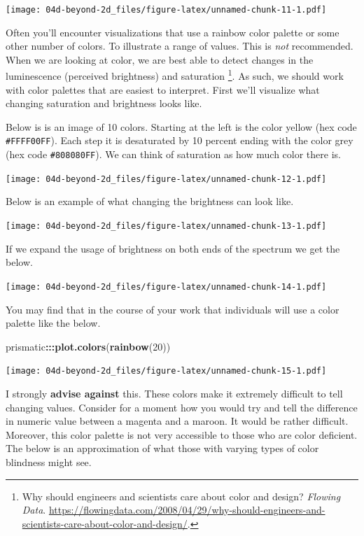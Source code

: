 \documentclass[
]{book}
\newenvironment{Shaded}{\begin{snugshade}}{\end{snugshade}}
\newcommand{\DecValTok}[1]{\textcolor[rgb]{0.00,0.00,0.81}{#1}}
\newcommand{\KeywordTok}[1]{\textcolor[rgb]{0.13,0.29,0.53}{\textbf{#1}}}
\newcommand{\NormalTok}[1]{#1}
\newcommand{\OperatorTok}[1]{\textcolor[rgb]{0.81,0.36,0.00}{\textbf{#1}}}
\begin{document}
\texttt{[image: 04d-beyond-2d\_files/figure-latex/unnamed-chunk-11-1.pdf]}

Often you'll encounter visualizations that use a rainbow color palette or some other number of colors. To illustrate a range of values. This is \emph{not} recommended. When we are looking at color, we are best able to detect changes in the luminescence (perceived brightness) and saturation \footnote{Why should engineers and scientists care about color and design? \emph{Flowing Data}. \url{https://flowingdata.com/2008/04/29/why-should-engineers-and-scientists-care-about-color-and-design/}.}. As such, we should work with color palettes that are easiest to interpret. First we'll visualize what changing saturation and brightness looks like.

Below is is an image of 10 colors. Starting at the left is the color yellow (hex code \texttt{\#FFFF00FF}). Each step it is desaturated by 10 percent ending with the color grey (hex code \texttt{\#808080FF}). We can think of saturation as how much color there is.

\texttt{[image: 04d-beyond-2d\_files/figure-latex/unnamed-chunk-12-1.pdf]}

Below is an example of what changing the brightness can look like.

\texttt{[image: 04d-beyond-2d\_files/figure-latex/unnamed-chunk-13-1.pdf]}

If we expand the usage of brightness on both ends of the spectrum we get the below.

\texttt{[image: 04d-beyond-2d\_files/figure-latex/unnamed-chunk-14-1.pdf]}

You may find that in the course of your work that individuals will use a color palette like the below.

\begin{Shaded}
\begin{Highlighting}[]
\NormalTok{prismatic}\OperatorTok{:::}\KeywordTok{plot.colors}\NormalTok{(}\KeywordTok{rainbow}\NormalTok{(}\DecValTok{20}\NormalTok{))}
\end{Highlighting}
\end{Shaded}

\texttt{[image: 04d-beyond-2d\_files/figure-latex/unnamed-chunk-15-1.pdf]}

I strongly \textbf{advise against} this. These colors make it extremely difficult to tell changing values. Consider for a moment how you would try and tell the difference in numeric value between a magenta and a maroon. It would be rather difficult. Moreover, this color palette is not very accessible to those who are color deficient. The below is an approximation of what those with varying types of color blindness might see.
\end{document}
